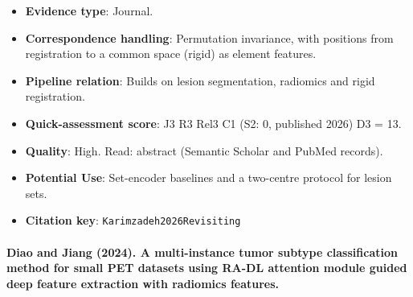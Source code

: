 \documentclass[journal,onecolumn]{IEEEtran}
\begin{document}
\begin{itemize}
\item{} \textbf{Evidence type}: Journal.

\item{} \textbf{Correspondence handling}: Permutation invariance, with positions from registration to a common space (rigid) as element features.

\item{} \textbf{Pipeline relation}: Builds on lesion segmentation, radiomics and rigid registration.

\item{} \textbf{Quick-assessment score}: J3 R3 Rel3 C1 (S2: 0, published 2026) D3 = 13.

\item{} \textbf{Quality}: High. Read: abstract (Semantic Scholar and PubMed records).

\item{} \textbf{Potential Use}: Set-encoder baselines and a two-centre protocol for lesion sets.

\item{} \textbf{Citation key}: \texttt{Karimzadeh2026Revisiting}

\end{itemize}

\paragraph{Diao and Jiang (2024). A multi-instance tumor subtype classification method for small PET datasets using RA-DL attention module guided deep feature extraction with radiomics features.~\cite{Diao2024Multi}}\mbox{}
\end{document}
